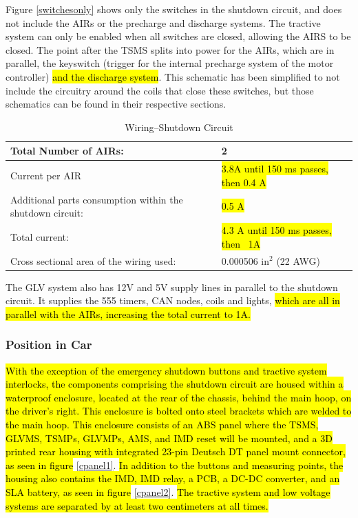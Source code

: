 \documentclass{article}
\DeclareRobustCommand{\hlr}[1]{{\sethlcolor{red}\hl{#1}}}
\begin{document}
            Figure \ref{switchesonly} shows only the switches in the shutdown circuit, and does not include the AIRs or the precharge and discharge systems. The tractive system can only be enabled when all switches are closed, allowing the AIRS to be closed. The point after the TSMS splits into power for the AIRs, which are in parallel, the keyswitch (trigger for the internal precharge system of the motor controller) \hlr{and the discharge system}. This schematic has been simplified to not include the circuitry around the coils that close these switches, but those schematics can be found in their respective sections.

            \begin{table}[H]
                \centering
                \begin{tabular}{|l|l|}
                \hline
                    Total Number of AIRs: & 2 \\ \hline
                    Current per AIR & \hlr{ 3.8A until 150 ms passes, then 0.4 A} \\ \hline
                    Additional parts consumption within the shutdown circuit: & \hlr{0.5 A }\\ \hline
                    Total current: & \hlr{4.3 A until 150 ms passes, then ~1A} \\ \hline
                    Cross sectional area of the wiring used: & 0.000506 in$^{2}$ (22 AWG) \\ \hline
                \end{tabular}
                \caption{Wiring--Shutdown Circuit}
                \label{ShutdownCircuitTable}
            \end{table}

            The GLV system also has 12V and 5V supply lines in parallel to the shutdown circuit. It supplies the 555 timers, CAN nodes, coils and lights, \hlr{ which are all in parallel with the AIRs, increasing the total current to 1A. }

        \subsubsection{Position in Car}

        \hlr{With the exception of the emergency shutdown buttons and tractive system interlocks, the components comprising the shutdown circuit are housed within a waterproof enclosure, located at the rear of the chassis, behind the main hoop, on the driver's right.  This enclosure is bolted onto steel brackets which are welded to the main hoop.  This enclosure consists of an ABS panel where the TSMS, GLVMS, TSMPs, GLVMPs, AMS, and IMD reset will be mounted, and a 3D printed rear housing with integrated 23-pin Deutsch DT panel mount connector, as seen in figure} \ref{cpanel1}. \hlr{In addition to the buttons and measuring points, the housing also contains the IMD, IMD relay, a PCB, a DC-DC converter, and an SLA battery, as seen in figure} \ref{cpanel2}.  \hlr{The tractive system and low voltage systems are separated by at least two centimeters at all times.}
\end{document}
